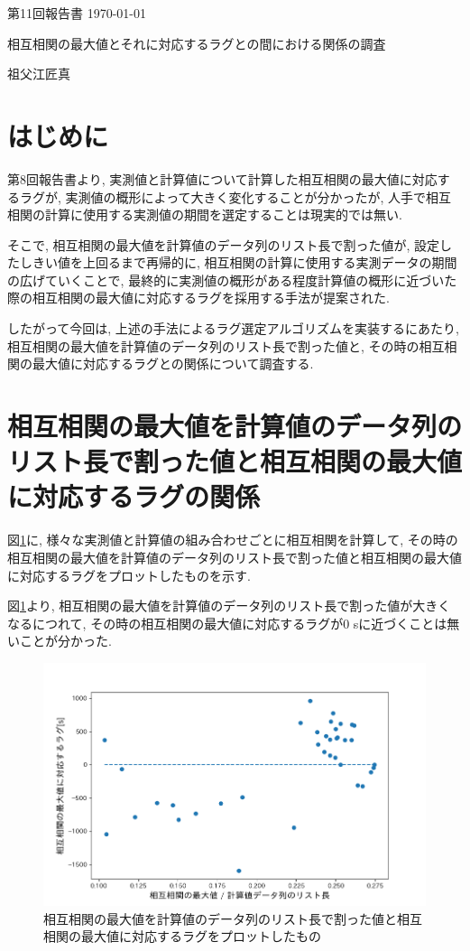 \documentclass[a4j,12pt,]{jarticle}
\begin{document}
{\noindent\small 第11回報告書 \hfill\today}
\begin{center}
  {\Large 相互相関の最大値とそれに対応するラグとの間における関係の調査}
\end{center}
\begin{flushright}
  祖父江匠真 \\
\end{flushright}

\section{はじめに}
第8回報告書より, 実測値と計算値について計算した相互相関の最大値に対応するラグが, 実測値の概形によって大きく変化することが分かったが, 人手で相互相関の計算に使用する実測値の期間を選定することは現実的では無い.

そこで, 相互相関の最大値を計算値のデータ列のリスト長で割った値が, 設定したしきい値を上回るまで再帰的に, 相互相関の計算に使用する実測データの期間の広げていくことで, 最終的に実測値の概形がある程度計算値の概形に近づいた際の相互相関の最大値に対応するラグを採用する手法が提案された.

したがって今回は, 上述の手法によるラグ選定アルゴリズムを実装するにあたり, 相互相関の最大値を計算値のデータ列のリスト長で割った値と, その時の相互相関の最大値に対応するラグとの関係について調査する.

\section{相互相関の最大値を計算値のデータ列のリスト長で割った値と相互相関の最大値に対応するラグの関係}
図\ref{p1}に, 様々な実測値と計算値の組み合わせごとに相互相関を計算して, その時の相互相関の最大値を計算値のデータ列のリスト長で割った値と相互相関の最大値に対応するラグをプロットしたものを示す.

図\ref{p1}より, 相互相関の最大値を計算値のデータ列のリスト長で割った値が大きくなるにつれて, その時の相互相関の最大値に対応するラグが0 \si{\second}に近づくことは無いことが分かった.

\begin{figure}[H]
  \begin{center}
    \includegraphics[width=160mm]{1.png}
    \caption{相互相関の最大値を計算値のデータ列のリスト長で割った値と相互相関の最大値に対応するラグをプロットしたもの}
    \label{p1}
  \end{center}
\end{figure}
\end{document}
